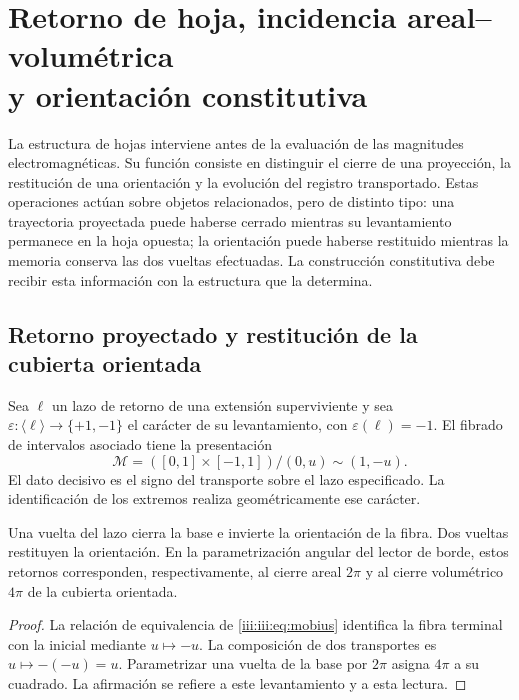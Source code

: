 \section[Retorno de hoja, incidencia areal--volumétrica y orientación constitutiva]{Retorno de hoja, incidencia areal--volumétrica\\y orientación constitutiva}
\label{iii:iii:sec:hojas}

La estructura de hojas interviene antes de la evaluación de las magnitudes
electromagnéticas. Su función consiste en distinguir el cierre de una proyección,
la restitución de una orientación y la evolución del registro transportado.
Estas operaciones actúan sobre objetos relacionados, pero de distinto tipo: una
trayectoria proyectada puede haberse cerrado mientras su levantamiento permanece
en la hoja opuesta; la orientación puede haberse restituido mientras la memoria
conserva las dos vueltas efectuadas. La construcción constitutiva debe recibir
esta información con la estructura que la determina.

\subsection{Retorno proyectado y restitución de la cubierta orientada}

Sea $\ell$ un lazo de retorno de una extensión superviviente y sea
$\varepsilon:\langle\ell\rangle\to\{+1,-1\}$ el carácter de su
levantamiento, con $\varepsilon(\ell)=-1$. El fibrado de intervalos asociado
tiene la presentación
\begin{equation}
 \mathcal M=([0,1]\times[-1,1])/{(0,u)\sim(1,-u)}.
 \label{iii:iii:eq:mobius}
\end{equation}
El dato decisivo es el signo del transporte sobre el lazo especificado. La
identificación de los extremos realiza geométricamente ese carácter.

\begin{proposition}
Una vuelta del lazo cierra la base e invierte la orientación de la fibra. Dos
vueltas restituyen la orientación. En la parametrización angular del lector de
borde, estos retornos corresponden, respectivamente, al cierre areal $2\pi$ y
al cierre volumétrico $4\pi$ de la cubierta orientada.
\end{proposition}
\begin{proof}
La relación de equivalencia de \eqref{iii:iii:eq:mobius} identifica la fibra terminal
con la inicial mediante $u\mapsto-u$. La composición de dos transportes es
$u\mapsto-(-u)=u$. Parametrizar una vuelta de la base por $2\pi$ asigna $4\pi$
a su cuadrado. La afirmación se refiere a este levantamiento y a esta lectura.
\end{proof}

